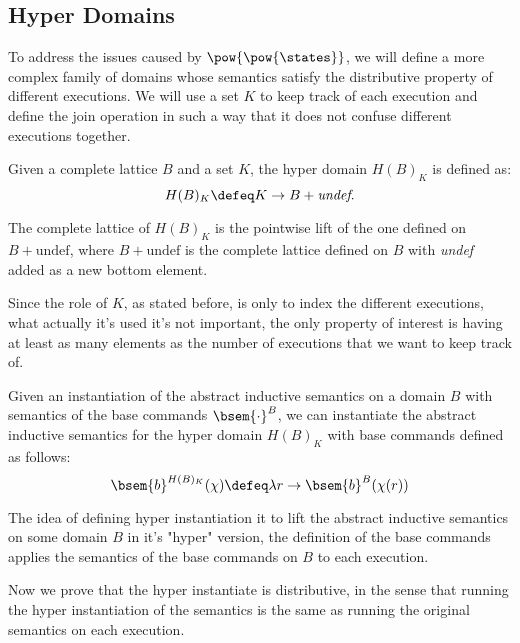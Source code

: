 \subsection{Hyper Domains}

To address the issues caused by $\pow{\pow{\states}}$, we will define a more 
complex family of domains whose semantics satisfy the distributive property of 
different executions. We will use a set $K$ to keep track of each execution and 
define the join operation in such a way that it does not confuse different 
executions together.

\begin{definition}
  Given a complete lattice $B$ and a set $K$, the hyper domain $H(B)_K$ is 
  defined as:
  $$H(B)_K \defeq K \to B + \textit{undef}.$$

  The complete lattice of $H(B)_K$ is the pointwise lift of the one defined on 
  $B + \text{undef}$, where $B + \text{undef}$ is the complete lattice defined 
  on $B$ with \textit{undef} added as a new bottom element.
\end{definition}

Since the role of $K$, as stated before, is only to index the different 
executions, what actually it's used it's not important, the only property of
interest is having at least as many elements as the number of executions that
we want to keep track of.

\begin{definition}
  Given an instantiation of the abstract inductive semantics on a domain $B$ 
  with semantics of the base commands $\bsem{\cdot}^B$, we can instantiate the 
  abstract inductive semantics for the hyper domain $H(B)_K$ with base 
  commands defined as follows:
  $$\bsem{b}^{H(B)_K}(\chi) \defeq \lambda r \to \bsem{b}^B(\chi(r))$$
\end{definition}

The idea of defining hyper instantiation it to lift the abstract inductive 
semantics on some domain $B$ in it's "hyper" version, the definition of the base 
commands applies the semantics of the base commands on $B$ to each execution.

Now we prove that the hyper instantiate is distributive, in the sense that
running the hyper instantiation of the semantics is the same as running the 
original semantics on each execution.

